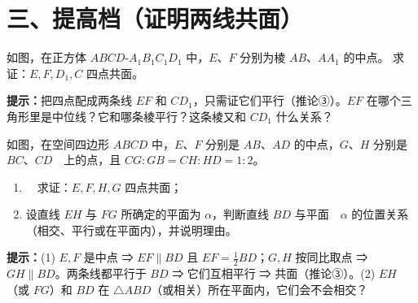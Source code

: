 \documentclass{exam-zh}
\begin{document}
\section*{三、提高档（证明两线共面）}


\begin{problem}[points=10]
  \noindent
  \begin{minipage}[t]{\dimexpr\linewidth-60mm-6mm\relax}
    \vspace{0pt}
    如图，在正方体 $ABCD\text{-}A_1B_1C_1D_1$ 中，$E$、$F$ 分别为棱 $AB$、$AA_1$ 的中点。
求证：$E,F,D_1,C$ 四点共面。

    \begin{hintbox}
\textbf{提示：}把四点配成两条线 $EF$ 和 $CD_1$，只需证它们平行（推论③）。$EF$ 在哪个三角形里是中位线？它和哪条棱平行？这条棱又和 $CD_1$ 什么关系？\end{hintbox}

  \end{minipage}\hfill
  \begin{diagramcoltikz}{60mm}{正方体，E、F 为中点，证 E,F,D1,C 共面。}
  }
  \end{diagramcoltikz}
  \par\medskip
  \answerarea[56mm]
\end{problem}



\begin{problem}[points=13]
  \noindent
  \begin{minipage}[t]{\dimexpr\linewidth-60mm-6mm\relax}
    \vspace{0pt}
    如图，在空间四边形 $ABCD$ 中，$E$、$F$ 分别是 $AB$、$AD$ 的中点，$G$、$H$ 分别是 $BC$、$CD$\ \ 上的点，且 $CG:GB=CH:HD=1:2$。
\begin{enumerate}[label=(\arabic*)]
  \item\ \ 求证：$E,F,H,G$ 四点共面；
  \item 设直线 $EH$ 与 $FG$ 所确定的平面为 $\alpha$，判断直线 $BD$ 与平面\ \ $\alpha$ 的位置关系（相交、平行或在平面内），并说明理由。
\end{enumerate}

    \begin{hintbox}
\textbf{提示：}(1) $E,F$ 是中点 ⇒ $EF\parallel BD$ 且 $EF=\tfrac12BD$；$G,H$ 按同比取点 ⇒ $GH\parallel BD$。两条线都平行于 $BD$ ⇒ 它们互相平行 ⇒ 共面（推论③）。(2) $EH$（或 $FG$）和 $BD$ 在 $\triangle ABD$（或相关）所在平面内，它们会不会相交？\end{hintbox}

  \end{minipage}\hfill
  \begin{diagramcoltikz}{60mm}{空间四边形 ABCD，E、F 为 AB、AD 中点，G、H 按 1:2 分 BC、CD。}
  }
  \end{diagramcoltikz}
  \par\medskip
  \answerarea[68mm]
\end{problem}
\end{document}
